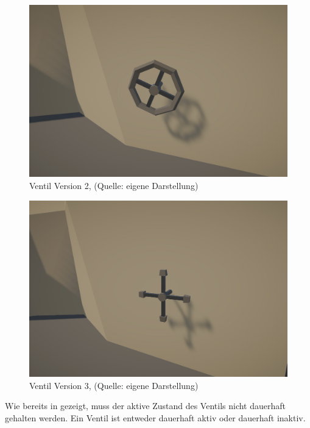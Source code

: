 \begin{figure}[ht]
\centering
\includegraphics[width=0.8\linewidth]{content/pictures/Vault_02.jpg}
\caption{Ventil Version 2, (Quelle: eigene Darstellung)}
\label{fig:valve_02}
\end{figure}

\newpage

\begin{figure}[ht]
\centering
\includegraphics[width=0.8\linewidth]{content/pictures/Vault_03.jpg}
\caption{Ventil Version 3, (Quelle: eigene Darstellung)}
\label{fig:valve_03}
\end{figure}

Wie bereits in  gezeigt, muss der aktive Zustand des Ventils nicht dauerhaft gehalten werden. Ein Ventil ist entweder dauerhaft aktiv oder dauerhaft inaktiv.
\newpage
